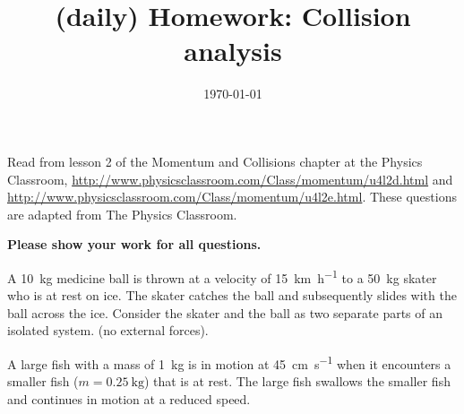 \documentclass[hw,addpoints,noanswers]{exam}
\title{(daily) Homework: Collision analysis}
\author{\mobeardInstructorShort}
\date{\today}
\begin{document}
\maketitle

Read from lesson 2 of the Momentum and Collisions chapter at the Physics Classroom, \url{http://www.physicsclassroom.com/Class/momentum/u4l2d.html} and \url{http://www.physicsclassroom.com/Class/momentum/u4l2e.html}. These questions are adapted from The Physics Classroom. 

\textbf{Please show your work for all questions.}

\begin{questions}
\question
A \SI{10}{\kilo\gram} medicine ball is thrown at a velocity of \SI{15}{\kilo\meter\per\hour} to a \SI{50}{\kilo\gram} skater who is at rest on ice. The skater catches the ball and subsequently slides with the ball across the ice. Consider the skater and the ball as two separate parts of an isolated system. (no external forces). 

\question
A large fish with a mass of \SI{1}{\kilo\gram} is in motion at \SI{45}{\centi\meter\per\second} when it encounters a smaller fish ($m=\SI{0.25}{\kilo\gram}$) that is at rest. The large fish swallows the smaller fish and continues in motion at a reduced speed.
\begin{parts}

\end{parts}
\end{questions}
\end{document}
